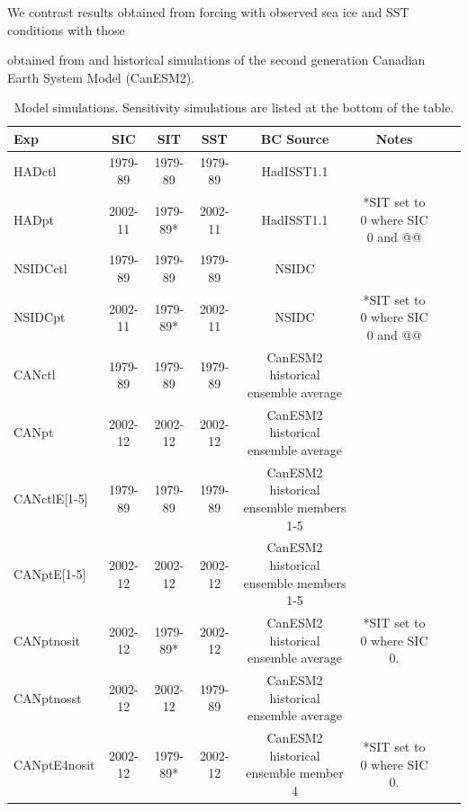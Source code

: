 \documentclass[twocol]{ametsoc}
\begin{document}
 We contrast results obtained from forcing with observed sea ice and SST conditions with those 

 obtained from  and historical simulations of the second generation Canadian Earth System Model (CanESM2).


\begin{table}[t]
\caption{Model simulations. Sensitivity simulations are listed at the bottom of the table.}\label{simstbl}
\begin{center}
\begin{tabular}{lccccccc}
\hline\hline
Exp & SIC & SIT & SST & BC Source & Notes\\
\hline
 HADctl & 1979-89 & 1979-89 & 1979-89 & HadISST1.1 \\
 HADpt & 2002-11 & 1979-89* & 2002-11 & HadISST1.1 & *SIT set to 0 where SIC 0 and @@\\
 NSIDCctl & 1979-89 & 1979-89 & 1979-89 & NSIDC \\
 NSIDCpt & 2002-11 & 1979-89* & 2002-11 & NSIDC & *SIT set to 0 where SIC 0 and @@\\
 CANctl & 1979-89 & 1979-89 & 1979-89 & CanESM2 historical ensemble average\\
 CANpt & 2002-12 & 2002-12 & 2002-12 &  CanESM2 historical ensemble average\\
 CANctlE[1-5] & 1979-89 & 1979-89 & 1979-89  & CanESM2 historical ensemble members 1-5\\
 CANptE[1-5] & 2002-12 & 2002-12 & 2002-12 &  CanESM2 historical ensemble members 1-5\\
 \hline
 \hline
 CANptnosit & 2002-12 & 1979-89* & 2002-12 &  CanESM2 historical ensemble average & *SIT set to 0 where SIC 0. \\
 CANptnosst & 2002-12 & 2002-12 & 1979-89 &  CanESM2 historical ensemble average & \\
 CANptE4nosit  & 2002-12 & 1979-89* & 2002-12 &  CanESM2 historical ensemble member 4 & *SIT set to 0 where SIC 0. \\
\hline
\end{tabular}
\end{center}
\end{table}
\end{document}
